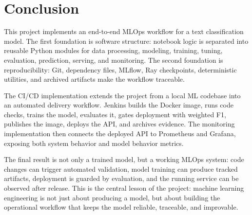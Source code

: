 \documentclass[11pt,a4paper]{article}
\begin{document}
\section{Conclusion}

This project implements an end-to-end MLOps workflow for a text classification model. The first foundation is software structure: notebook logic is separated into reusable Python modules for data processing, modeling, training, tuning, evaluation, prediction, serving, and monitoring. The second foundation is reproducibility: Git, dependency files, MLflow, Ray checkpoints, deterministic utilities, and archived artifacts make the workflow traceable.

The CI/CD implementation extends the project from a local ML codebase into an automated delivery workflow. Jenkins builds the Docker image, runs code checks, trains the model, evaluates it, gates deployment with weighted F1, publishes the image, deploys the API, and archives evidence. The monitoring implementation then connects the deployed API to Prometheus and Grafana, exposing both system behavior and model behavior metrics.

The final result is not only a trained model, but a working MLOps system: code changes can trigger automated validation, model training can produce tracked artifacts, deployment is guarded by evaluation, and the running service can be observed after release. This is the central lesson of the project: machine learning engineering is not just about producing a model, but about building the operational workflow that keeps the model reliable, traceable, and improvable.
\end{document}
